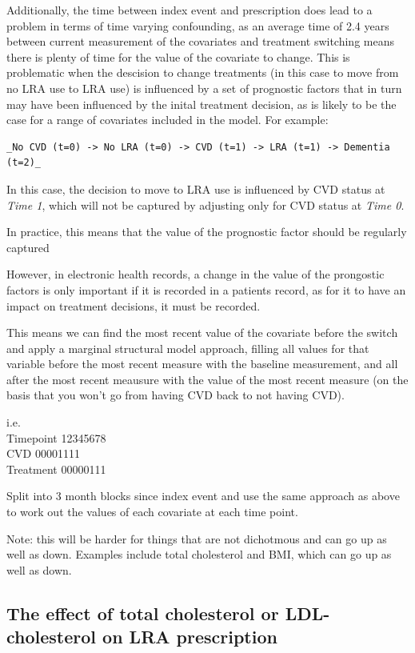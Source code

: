 \documentclass[a4paper, twoside]{templates/ociamthesis}
\begin{document}
Additionally, the time between index event and prescription does lead to a problem in terms of time varying confounding, as an average time of 2.4 years between current measurement of the covariates and treatment switching means there is plenty of time for the value of the covariate to change. This is problematic when the descision to change treatments (in this case to move from no LRA use to LRA use) is influenced by a set of prognostic factors that in turn may have been influenced by the inital treatment decision, as is likely to be the case for a range of covariates included in the model. For example:

\begin{verbatim}
_No CVD (t=0) -> No LRA (t=0) -> CVD (t=1) -> LRA (t=1) -> Dementia (t=2)_
\end{verbatim}

In this case, the decision to move to LRA use is influenced by CVD status at \emph{Time 1}, which will not be captured by adjusting only for CVD status at \emph{Time 0}.

In practice, this means that the value of the prognostic factor should be regularly captured

However, in electronic health records, a change in the value of the prongostic factors is only important if it is recorded in a patients record, as for it to have an impact on treatment decisions, it must be recorded.

This means we can find the most recent value of the covariate before the switch and apply a marginal structural model approach, filling all values for that variable before the most recent measure with the baseline measurement, and all after the most recent meausure with the value of the most recent measure (on the basis that you won't go from having CVD back to not having CVD).

i.e.\\
Timepoint 12345678\\
CVD 00001111\\
Treatment 00000111

Split into 3 month blocks since index event and use the same approach as above to work out the values of each covariate at each time point.

Note: this will be harder for things that are not dichotmous and can go up as well as down. Examples include total cholesterol and BMI, which can go up as well as down.

\hypertarget{the-effect-of-total-cholesterol-or-ldl-cholesterol-on-lra-prescription}{%
\subsection{The effect of total cholesterol or LDL-cholesterol on LRA prescription}\label{the-effect-of-total-cholesterol-or-ldl-cholesterol-on-lra-prescription}}
\end{document}
